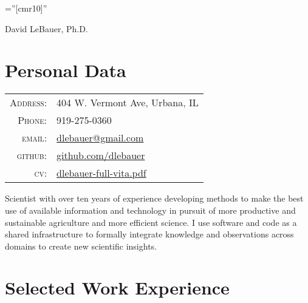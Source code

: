 \documentclass[a4paper,10pt]{article}
\begin{document}

\pagestyle{empty} %

\font\fb=''[cmr10]'' %

\par{\centering
		{\Huge David LeBauer, Ph.D.
	}\bigskip\par}

\section{Personal Data}

\begin{tabular}{rl}
    \textsc{Address:}   & 404 W. Vermont Ave, Urbana, IL \\
    \textsc{Phone:}     & 919-275-0360\\
    \textsc{email:}     &   
        \href{mailto:dlebauer@gmail.com}{dlebauer@gmail.com}\\
    \textsc{github:}    &     
        \href{https://github.com/dlebauer}{github.com/dlebauer}\\
    \textsc{cv:}        &
        \href{https://github.com/dlebauer/vita/raw/master/dlebauer-full-vita.pdf}{dlebauer-full-vita.pdf}

\end{tabular}

Scientist with over ten years of experience developing methods to make the best use of available information and technology in pursuit of more productive and sustainable agriculture and more efficient science. I use software and code as a shared infrastructure to formally integrate knowledge and observations across domains to create new scientific insights.

\section{Selected Work Experience}
\end{document}

